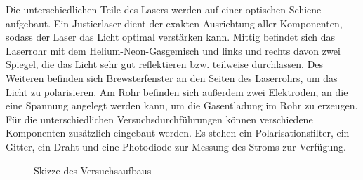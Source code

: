 Die unterschiedlichen Teile des Lasers werden auf einer optischen Schiene aufgebaut. Ein Justierlaser dient der exakten
Ausrichtung aller Komponenten, sodass der Laser das Licht optimal verstärken kann. Mittig befindet sich das Laserrohr
mit dem Helium-Neon-Gasgemisch und links und rechts davon zwei Spiegel, die das Licht sehr gut reflektieren bzw. teilweise
durchlassen. Des Weiteren befinden sich Brewsterfenster an den Seiten des Laserrohrs, um das Licht zu polarisieren.
Am Rohr befinden sich außerdem zwei Elektroden, an die eine Spannung angelegt werden kann, um die Gasentladung im Rohr zu
erzeugen.
Für die unterschiedlichen Versuchsdurchführungen können verschiedene Komponenten zusätzlich eingebaut werden. Es stehen
ein Polarisationsfilter, ein Gitter, ein Draht und eine Photodiode zur Messung des Stroms zur Verfügung.

\begin{figure}[H]
  \centering
  \caption{Skizze des Versuchsaufbaus}
  \label{fig:aufbau}
\end{figure}
